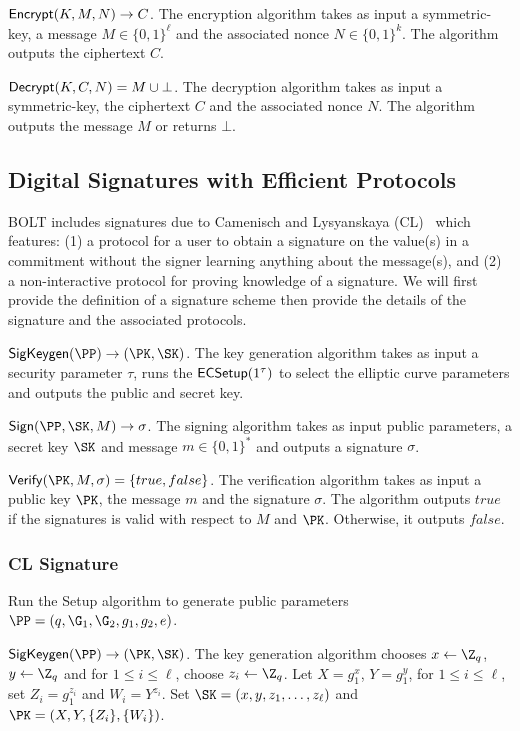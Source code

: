 \documentclass[11pt]{report}
\begin{document}
\medskip \noindent
${\sf Encrypt}(K, M, N) \rightarrow C$. The encryption algorithm takes as input a symmetric-key, a message $M \in \{0,1\}^\ell$ and the associated nonce $N \in \{0,1\}^k$. The algorithm outputs the ciphertext $C$. 

\medskip \noindent
${\sf Decrypt}(K, C, N) = M \cup \bot$. The decryption algorithm takes as input a symmetric-key, the ciphertext $C$ and the associated nonce $N$. The algorithm outputs the message $M$ or returns $\bot$.

\subsection{Digital Signatures with Efficient Protocols} %
\label{sec:signatures}

BOLT includes signatures due to Camenisch and Lysyanskaya (CL)~\cite{CL04} which features: (1) a protocol for a user to obtain a signature on the value(s) in a commitment without the signer learning anything about the message(s), and (2) a non-interactive protocol for proving knowledge of a signature. We will first provide the definition of a signature scheme then provide the details of the signature and the associated protocols.

\medskip \noindent
${\sf SigKeygen}(\PP) \rightarrow (\PK, \SK)$. The key generation algorithm takes as input a security parameter $\tau$, runs the ${\sf ECSetup}(1^\tau)$ to select the elliptic curve parameters and outputs the public and secret key.

\medskip \noindent
${\sf Sign}(\PP, \SK, M) \rightarrow \sigma$. The signing algorithm takes as input public parameters, a secret key $\SK$ and message $m \in \{0,1\}^*$ and outputs a signature $\sigma$.

\medskip \noindent
${\sf Verify}(\PK, M, \sigma) =  \{true, false\}$. The verification algorithm takes as input a public key $\PK$, the message $m$ and the signature $\sigma$. The algorithm outputs $true$ if the signatures is valid with respect to $M$ and $\PK$. Otherwise, it outputs $false$.

\subsubsection{CL Signature~\cite{CL04}}
\label{sec:clsigs}

Run the {\sf Setup} algorithm to generate public parameters $\PP = (q, \G_1, \G_2, g_1, g_2, e)$.

\medskip \noindent
${\sf SigKeygen}(\PP) \rightarrow (\PK, \SK)$. The key generation algorithm chooses $x \leftarrow \Z_q$, $y \leftarrow \Z_q$ and for $1 \le i \le \ell$, choose $z_i \leftarrow \Z_q$. Let $X = g_1^x$, $Y = g_1^y$, for $1 \le i \le \ell$, set $Z_i = g_1^{z_i}$ and $W_i = Y^{z_i}$.  Set $\SK = (x, y, {z_1, \dots, z_\ell})$ and $\PK = (X, Y, \{Z_i\}, \{W_i\})$.
\end{document}
